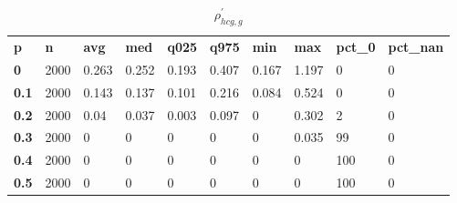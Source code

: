 \begin{table}[h]
 \centering 
\footnotesize
\caption{$\rho_{hcg,g}^\prime $}
\label{tab:alphahcgg}
\begin{tabular}[h]{| l l l l l l l l l l|
    } \hline
\textbf{ p} & \textbf{ n} & \textbf{ avg} & \textbf{ med} & \textbf{ q025} & \textbf{ q975} & \textbf{ min} & \textbf{ max} & \textbf{ pct\_0} & \textbf{ pct\_nan}
           \\
  \textbf{  0} & 2000 & 0.263 & 0.252 & 0.193 & 0.407 & 0.167 & 1.197 &   0 & 0
           \\
  \textbf{0.1} & 2000 & 0.143 & 0.137 & 0.101 & 0.216 & 0.084 & 0.524 &   0 & 0
           \\
  \textbf{0.2} & 2000 &  0.04 & 0.037 & 0.003 & 0.097 &     0 & 0.302 &   2 & 0
           \\
  \textbf{0.3} & 2000 &     0 &     0 &     0 &     0 &     0 & 0.035 &  99 & 0
           \\
  \textbf{0.4} & 2000 &     0 &     0 &     0 &     0 &     0 &     0 & 100 & 0
           \\
  \textbf{0.5} & 2000 &     0 &     0 &     0 &     0 &     0 &     0 & 100 & 0
           \\
 \hline \end{tabular}
 \end{table}
